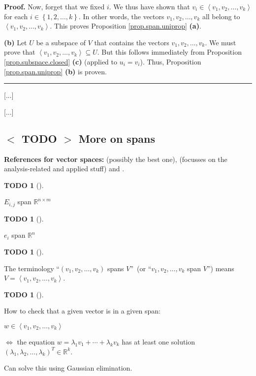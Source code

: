 \documentclass[numbers=enddot,12pt,final,onecolumn,notitlepage]{scrartcl}%
\theoremstyle{definition}
\newtheorem{quest}[theo]{TODO}
\newenvironment{todo}[1][]
{\begin{quest}[#1]\begin{leftbar}}
{\end{leftbar}\end{quest}}
\newenvironment{proof}[1][Proof]{\noindent\textbf{#1.} }{\ \rule{0.5em}{0.5em}}
\begin{document}
\begin{proof}
Now, forget that we fixed $i$. We thus have shown that $v_{i}\in\left\langle
v_{1},v_{2},\ldots,v_{k}\right\rangle $ for each $i\in\left\{  1,2,\ldots
,k\right\}  $. In other words, the vectors $v_{1},v_{2},\ldots,v_{k}$ all
belong to $\left\langle v_{1},v_{2},\ldots,v_{k}\right\rangle $. This proves
Proposition \ref{prop.span.uniprop} \textbf{(a)}.

\textbf{(b)} Let $U$ be a subspace of $V$ that contains the vectors
$v_{1},v_{2},\ldots,v_{k}$. We must prove that $\left\langle v_{1}%
,v_{2},\ldots,v_{k}\right\rangle \subseteq U$. But this follows immediately
from Proposition \ref{prop.subspace.closed} \textbf{(c)} (applied to
$u_{i}=v_{i}$). Thus, Proposition \ref{prop.span.uniprop} \textbf{(b)} is proven.
\end{proof}

[...]

[...]

\subsection{%
$<$%
TODO%
$>$
More on spans}

\textbf{References for vector spaces:} \cite[\S 5.1]{LaNaSc16} (possibly the
best one), \cite[\S 2.3]{OlvSha06} (focusses on the analysis-related and
applied stuff) and \cite[Two.I.2]{Heffer16}.



\begin{todo}
$E_{i,j}$ span $\mathbb{R}^{n\times m}$
\end{todo}



\begin{todo}
$e_{i}$ span $\mathbb{R}^{n}$
\end{todo}



\begin{todo}
The terminology \textquotedblleft$\left(  v_{1},v_{2},\ldots,v_{k}\right)  $
spans $V$\textquotedblright\ (or \textquotedblleft$v_{1},v_{2},\ldots,v_{k}$
span $V$\textquotedblright) means $V=\left\langle v_{1},v_{2},\ldots
,v_{k}\right\rangle $.
\end{todo}



\begin{todo}
How to check that a given vector is in a given span:

$w\in\left\langle v_{1},v_{2},\ldots,v_{k}\right\rangle $

$\Longleftrightarrow$ the equation $w=\lambda_{1}v_{1}+\cdots+\lambda_{k}%
v_{k}$ has at least one solution $\left(  \lambda_{1},\lambda_{2}%
,\ldots,\lambda_{k}\right)  ^{T}\in\mathbb{R}^{k}$.

Can solve this using Gaussian elimination.
\end{todo}
\end{document}
